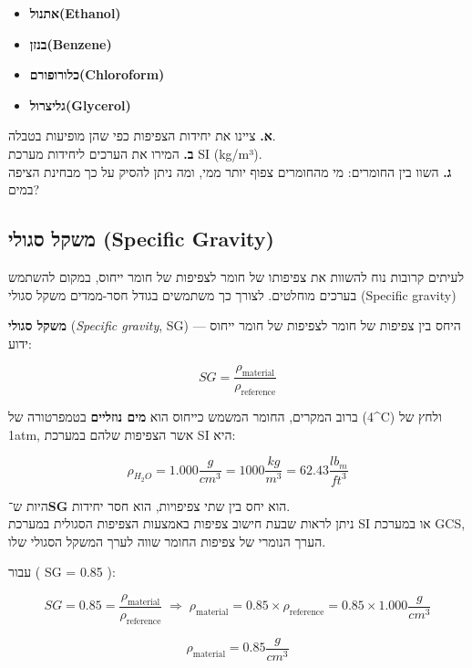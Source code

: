 \documentclass[
  hebrew,
  letterpaper,
  DIV=11,
  numbers=noendperiod]{scrreprt}
\providecommand{\tightlist}{%
  \setlength{\itemsep}{0pt}\setlength{\parskip}{0pt}}
\begin{document}
\begin{itemize}
\tightlist
\item
  \textbf{{אתנול}(Ethanol){}}
\item
  \textbf{{בנזן}(Benzene){}}
\item
  \textbf{{כלורופורם}(Chloroform){}}
\item
  \textbf{{גליצרול}(Glycerol){}}
\end{itemize}

{\textbf{א.} ציינו את יחידות הצפיפות כפי שהן מופיעות בטבלה.}\\
{\textbf{ב.} המירו את הערכים ליחידות מערכת} SI (kg/m³){.}\\
{\textbf{ג.} השוו בין החומרים: מי מהחומרים צפוף יותר ממי, ומה ניתן להסיק
על כך מבחינת הציפה במים?}

\subsection{\texorpdfstring{{משקל סגולי} (Specific
Gravity)}{משקל סגולי (Specific Gravity)}}\label{ux5deux5e9ux5e7ux5dc-ux5e1ux5d2ux5d5ux5dcux5d9-specific-gravity}

{לעיתים קרובות נוח להשוות את צפיפותו של חומר לצפיפות של חומר ייחוס},
{במקום להשתמש בערכים מוחלטים}. {לצורך כך משתמשים בגודל חסר-ממדים משקל
סגולי (}Specific gravity{)}

\textbf{משקל סגולי} (\emph{Specific gravity}, SG) --- היחס בין צפיפות של
חומר לצפיפות של חומר ייחוס ידוע:

\[
SG = \frac{\rho_{\text{material}}}{\rho_{\text{reference}}}
\]

ברוב המקרים, החומר המשמש כייחוס הוא \textbf{מים נוזליים} בטמפרטורה של
(4\^{}\circ C) ולחץ של ‎1‎atm, אשר הצפיפות שלהם במערכת ‎SI‎ היא:

\[
\rho_{H_2O} = 1.000\frac{g}{cm^{3}} = 1000\frac{kg}{m^{3}} = 62.43\frac{lb_{m}}{ft^{3}}
\]

היות ש־\textbf{SG} הוא יחס בין שתי צפיפויות, הוא חסר יחידות.\\
ניתן לראות שבעת חישוב צפיפות באמצעות הצפיפות הסגולית במערכת ‎SI‎ או במערכת
‎GCS‎, הערך הנומרי של צפיפות החומר שווה לערך המשקל הסגולי שלו.

עבור ( SG = 0.85 ):

\[
SG = 0.85 = \frac{\rho_{\text{material}}}{\rho_{\text{reference}}}
\;\Rightarrow\;
\rho_{\text{material}} = 0.85 \times \rho_{\text{reference}} = 0.85 \times 1.000\frac{g}{cm^{3}}
\]

\[
\rho_{\text{material}} = 0.85\frac{g}{cm^{3}}
\]
\end{document}
